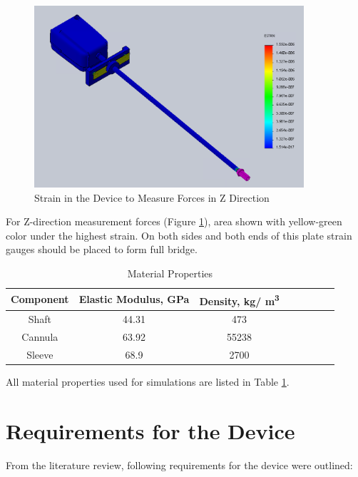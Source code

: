 \begin{figure}[h]
	\begin{center}
		\includegraphics[width=100mm]{fig/methods/z_dir_sim.png}
	\end{center}
	\vspace{-4mm}
	\caption[Strain in the Device to Measure Forces in Z Direction]
	{Strain in the Device to Measure Forces in Z Direction}
	\label{fig:Zdev}
	\vspace{-2mm}
\end{figure}

For Z-direction measurement forces (Figure \ref{fig:Zdev}), area shown with yellow-green color under the highest strain. On both sides and both ends of this plate strain gauges should be placed to form full bridge.

\begin{table}
\caption {Material Properties} \label{tab:matProp} 
\begin{center}
\begin{tabular}{ | c | c | c | c | c | c | c | c | } 
\hline
Component & Elastic Modulus, GPa & Density, kg/ m\textsuperscript{3} \\ 
\hline
Shaft & 44.31 & 473\\ 
\hline
Cannula & 63.92 & 55238 \\ 
\hline
Sleeve & 68.9 & 2700  \\ 
\hline
\end{tabular}
\end{center}
\end{table}

All material properties used for simulations are listed in Table \ref{tab:matProp}.

\section{Requirements for the Device}
	\label{sec:DevReq}
	From the literature review, following requirements for the device were outlined:
	
